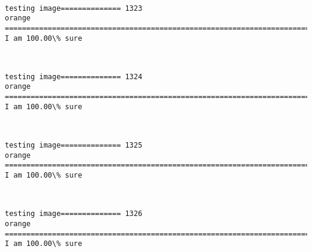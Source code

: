\documentclass[11pt]{article}
\begin{document}
    \begin{center}
    \end{center}
    { \hspace*{\fill} \\}
    
    \begin{Verbatim}[commandchars=\\\{\}]
testing image============== 1323
orange
============================================================================
I am 100.00\% sure

    \end{Verbatim}

    \begin{center}
    \end{center}
    { \hspace*{\fill} \\}
    
    \begin{Verbatim}[commandchars=\\\{\}]
testing image============== 1324
orange
============================================================================
I am 100.00\% sure

    \end{Verbatim}

    \begin{center}
    \end{center}
    { \hspace*{\fill} \\}
    
    \begin{Verbatim}[commandchars=\\\{\}]
testing image============== 1325
orange
============================================================================
I am 100.00\% sure

    \end{Verbatim}

    \begin{center}
    \end{center}
    { \hspace*{\fill} \\}
    
    \begin{Verbatim}[commandchars=\\\{\}]
testing image============== 1326
orange
============================================================================
I am 100.00\% sure

    \end{Verbatim}
\end{document}
